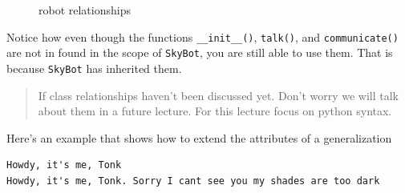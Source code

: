 \begin{figure}
\centering
\pandocbounded{}
\caption{robot relationships}
\end{figure}

Notice how even though the functions \texttt{\_\_init\_\_()},
\texttt{talk()}, and \texttt{communicate()} are not in found in the
scope of \texttt{SkyBot}, you are still able to use them. That is
because \texttt{SkyBot} has inherited them.

\begin{quote}
If class relationships haven't been discussed yet. Don't worry we will
talk about them in a future lecture. For this lecture focus on python
syntax.
\end{quote}

Here's an example that shows how to extend the attributes of a
generalization

\begin{Shaded}
\begin{Highlighting}[]
     \NormalTok{(}\NormalTok{):}
\NormalTok{(}
        \OperatorTok{=}

         \OperatorTok{\textgreater{}=} \NormalTok{:}
            \NormalTok{(}\OperatorTok{+} \OperatorTok{+} \NormalTok{)}
        \NormalTok{:}
            \NormalTok{(}\OperatorTok{+}\OperatorTok{+} \OperatorTok{+} 

\OperatorTok{=}\NormalTok{, }\NormalTok{)}
\end{Highlighting}
\end{Shaded}

\begin{verbatim}
Howdy, it's me, Tonk
Howdy, it's me, Tonk. Sorry I cant see you my shades are too dark
\end{verbatim}

